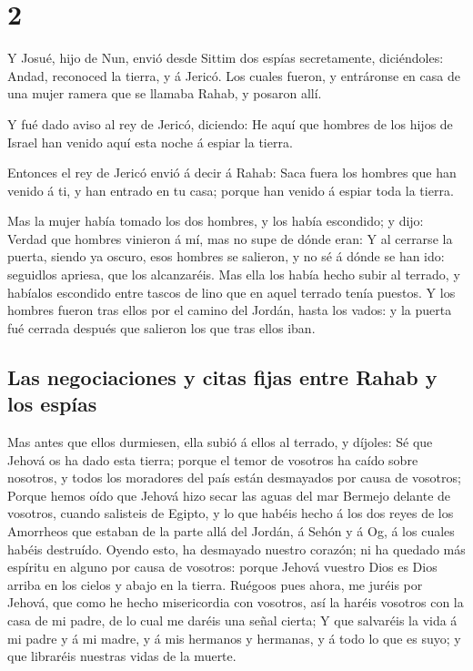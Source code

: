 \hypertarget{section-06-2}{%
\section{2}\label{section-06-2}}

 Y Josué, hijo de Nun, envió desde Sittim dos espías
secretamente, diciéndoles: Andad, reconoced la tierra, y á Jericó. Los
cuales fueron, y entráronse en casa de una mujer ramera que se llamaba
Rahab, y posaron allí.

 Y fué dado aviso al rey de Jericó, diciendo: He aquí que
hombres de los hijos de Israel han venido aquí esta noche á espiar la
tierra.

 Entonces el rey de Jericó envió á decir á Rahab: Saca
fuera los hombres que han venido á ti, y han entrado en tu casa; porque
han venido á espiar toda la tierra.

 Mas la mujer había tomado los dos hombres, y los había
escondido; y dijo: Verdad que hombres vinieron á mí, mas no supe de
dónde eran:  Y al cerrarse la puerta, siendo ya oscuro,
esos hombres se salieron, y no sé á dónde se han ido: seguidlos apriesa,
que los alcanzaréis.  Mas ella los había hecho subir al
terrado, y habíalos escondido entre tascos de lino que en aquel terrado
tenía puestos.  Y los hombres fueron tras ellos por el
camino del Jordán, hasta los vados: y la puerta fué cerrada después que
salieron los que tras ellos iban.

\hypertarget{las-negociaciones-y-citas-fijas-entre-rahab-y-los-espuxedas}{%
\subsection{Las negociaciones y citas fijas entre Rahab y los
espías}\label{las-negociaciones-y-citas-fijas-entre-rahab-y-los-espuxedas}}

 Mas antes que ellos durmiesen, ella subió á ellos al
terrado, y díjoles:  Sé que Jehová os ha dado esta tierra;
porque el temor de vosotros ha caído sobre nosotros, y todos los
moradores del país están desmayados por causa de vosotros;
 Porque hemos oído que Jehová hizo secar las aguas del
mar Bermejo delante de vosotros, cuando salisteis de Egipto, y lo que
habéis hecho á los dos reyes de los Amorrheos que estaban de la parte
allá del Jordán, á Sehón y á Og, á los cuales habéis destruído.
 Oyendo esto, ha desmayado nuestro corazón; ni ha quedado
más espíritu en alguno por causa de vosotros: porque Jehová vuestro Dios
es Dios arriba en los cielos y abajo en la tierra. 
Ruégoos pues ahora, me juréis por Jehová, que como he hecho misericordia
con vosotros, así la haréis vosotros con la casa de mi padre, de lo cual
me daréis una señal cierta;  Y que salvaréis la vida á mi
padre y á mi madre, y á mis hermanos y hermanas, y á todo lo que es
suyo; y que libraréis nuestras vidas de la muerte.

